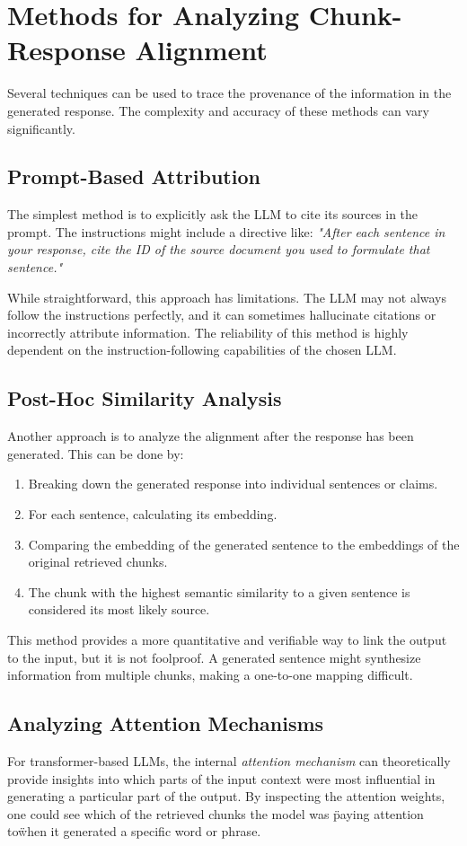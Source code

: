 \section{Methods for Analyzing Chunk-Response Alignment}
Several techniques can be used to trace the provenance of the information in the generated response. The complexity and accuracy of these methods can vary significantly.

\subsection{Prompt-Based Attribution}
The simplest method is to explicitly ask the LLM to cite its sources in the prompt. The instructions might include a directive like: \textit{"After each sentence in your response, cite the ID of the source document you used to formulate that sentence."}

While straightforward, this approach has limitations. The LLM may not always follow the instructions perfectly, and it can sometimes hallucinate citations or incorrectly attribute information. The reliability of this method is highly dependent on the instruction-following capabilities of the chosen LLM.

\subsection{Post-Hoc Similarity Analysis}
Another approach is to analyze the alignment after the response has been generated. This can be done by:
\begin{enumerate}
    \item Breaking down the generated response into individual sentences or claims.
    \item For each sentence, calculating its embedding.
    \item Comparing the embedding of the generated sentence to the embeddings of the original retrieved chunks.
    \item The chunk with the highest semantic similarity to a given sentence is considered its most likely source.
\end{enumerate}

This method provides a more quantitative and verifiable way to link the output to the input, but it is not foolproof. A generated sentence might synthesize information from multiple chunks, making a one-to-one mapping difficult.

\subsection{Analyzing Attention Mechanisms}
For transformer-based LLMs, the internal \textit{attention mechanism} can theoretically provide insights into which parts of the input context were most influential in generating a particular part of the output. By inspecting the attention weights, one could see which of the retrieved chunks the model was \"paying attention to\" when it generated a specific word or phrase.

